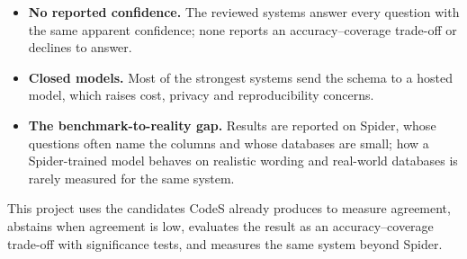 \begin{itemize}
	\item \textbf{No reported confidence.} The reviewed systems answer every question with the same apparent confidence; none reports an accuracy--coverage trade-off or declines to answer.
	\item \textbf{Closed models.} Most of the strongest systems send the schema to a hosted model, which raises cost, privacy and reproducibility concerns.
	\item \textbf{The benchmark-to-reality gap.} Results are reported on Spider, whose questions often name the columns and whose databases are small; how a Spider-trained model behaves on realistic wording and real-world databases is rarely measured for the same system.
\end{itemize}

This project uses the candidates CodeS already produces to measure agreement, abstains when agreement is low, evaluates the result as an accuracy--coverage trade-off with significance tests, and measures the same system beyond Spider.
